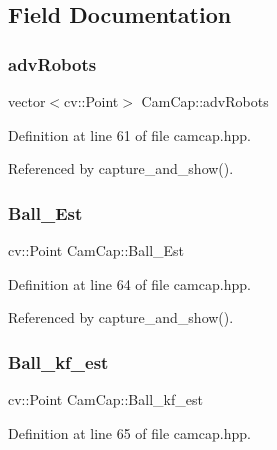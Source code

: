 \subsection{Field Documentation}
\mbox{\label{class_cam_cap_ae72873010cb7dae6e9842ccae917cae3}} 
\subsubsection{\texorpdfstring{adv\+Robots}{advRobots}}
{\footnotesize\ttfamily vector$<$cv\+::\+Point$>$ Cam\+Cap\+::adv\+Robots}



Definition at line 61 of file camcap.\+hpp.



Referenced by capture\+\_\+and\+\_\+show().

\mbox{\label{class_cam_cap_ae91debabf4943c74262acf6d60c6930f}} 
\subsubsection{\texorpdfstring{Ball\+\_\+\+Est}{Ball\_Est}}
{\footnotesize\ttfamily cv\+::\+Point Cam\+Cap\+::\+Ball\+\_\+\+Est}



Definition at line 64 of file camcap.\+hpp.



Referenced by capture\+\_\+and\+\_\+show().

\mbox{\label{class_cam_cap_a8e27afe151d46cfbf000fe900ce013b8}} 
\subsubsection{\texorpdfstring{Ball\+\_\+kf\+\_\+est}{Ball\_kf\_est}}
{\footnotesize\ttfamily cv\+::\+Point Cam\+Cap\+::\+Ball\+\_\+kf\+\_\+est}



Definition at line 65 of file camcap.\+hpp.



